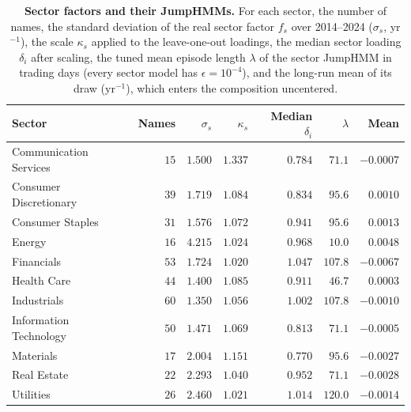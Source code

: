 \begin{table}[H]
\centering
\caption{\textbf{Sector factors and their JumpHMMs.} For each sector, the number of names, the standard deviation of
the real sector factor $f_s$ over 2014--2024 ($\sigma_s$, yr$^{-1}$), the scale $\kappa_s$ applied to the leave-one-out
loadings, the median sector loading $\delta_i$ after scaling, the tuned mean episode length $\lambda$ of the sector
JumpHMM in trading days (every sector model has $\epsilon = 10^{-4}$), and the long-run mean of its draw (yr$^{-1}$),
which enters the composition uncentered.}
\label{tab:S-sector-params}
\small
\begin{tabular}{@{}lrrrrrr@{}}
\toprule
\textbf{Sector} & \textbf{Names} & \textbf{$\sigma_s$} & \textbf{$\kappa_s$} & \textbf{Median $\delta_i$} &
  \textbf{$\lambda$} & \textbf{Mean} \\
\midrule
Communication Services & $15$ & $1.500$ & $1.337$ & $0.784$ & $71.1$ & $-0.0007$ \\
Consumer Discretionary & $39$ & $1.719$ & $1.084$ & $0.834$ & $95.6$ & $0.0010$ \\
Consumer Staples & $31$ & $1.576$ & $1.072$ & $0.941$ & $95.6$ & $0.0013$ \\
Energy & $16$ & $4.215$ & $1.024$ & $0.968$ & $10.0$ & $0.0048$ \\
Financials & $53$ & $1.724$ & $1.020$ & $1.047$ & $107.8$ & $-0.0067$ \\
Health Care & $44$ & $1.400$ & $1.085$ & $0.911$ & $46.7$ & $0.0003$ \\
Industrials & $60$ & $1.350$ & $1.056$ & $1.002$ & $107.8$ & $-0.0010$ \\
Information Technology & $50$ & $1.471$ & $1.069$ & $0.813$ & $71.1$ & $-0.0005$ \\
Materials & $17$ & $2.004$ & $1.151$ & $0.770$ & $95.6$ & $-0.0027$ \\
Real Estate & $22$ & $2.293$ & $1.040$ & $0.952$ & $71.1$ & $-0.0028$ \\
Utilities & $26$ & $2.460$ & $1.021$ & $1.014$ & $120.0$ & $-0.0014$ \\
\bottomrule
\end{tabular}
\end{table}
